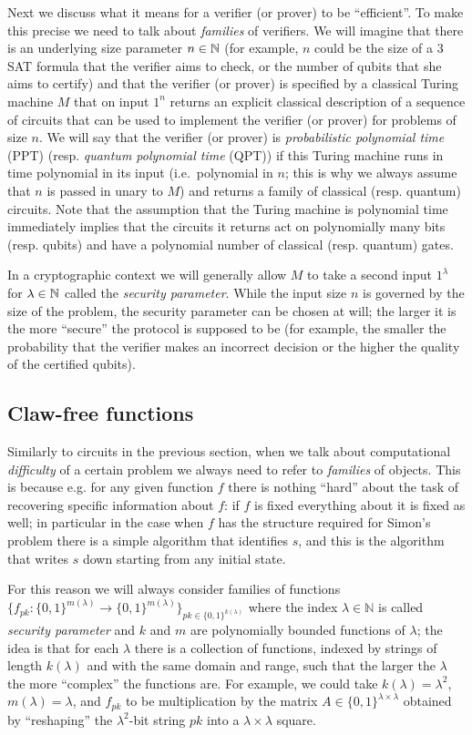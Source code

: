 Next we discuss what it means for a verifier (or prover) to be ``efficient''. To make this precise we need to talk about \emph{families} of verifiers. We will imagine that there is an underlying size parameter $n\in \mathbb{N}$ (for example, $n$ could be the size of a $3$SAT formula that the verifier aims to check, or the number of qubits that she aims to certify) and that the verifier (or prover) is specified by a classical Turing machine $M$ that on input $1^n$ returns an explicit classical description of a sequence of circuits that can be used to implement the verifier (or prover) for problems of size $n$. We will say that the verifier (or prover) is \emph{probabilistic polynomial time} (PPT) (resp. \emph{quantum polynomial time} (QPT)) if this Turing machine runs in time polynomial in its input (i.e.\ polynomial in $n$; this is why we always assume that $n$ is passed in unary to $M$) and returns a family of classical (resp. quantum) circuits. Note that the assumption that the Turing machine is polynomial time immediately implies that the circuits it returns act on polynomially many bits (resp. qubits) and have a polynomial number of classical (resp. quantum) gates. 

In a cryptographic context we will generally allow $M$ to take a second input $1^\lambda$ for $\lambda\in \mathbb{N}$ called the \emph{security parameter}. While the input size $n$ is governed by the size of the problem, the security parameter can be chosen at will; the larger it is the more ``secure'' the protocol is supposed to be (for example, the smaller the probability that the verifier makes an incorrect decision or the higher the quality of the certified qubits). 

\subsection{Claw-free functions}

Similarly to circuits in the previous section, when we talk about computational \emph{difficulty} of a certain problem we always need to refer to \emph{families} of objects. This is because e.g. for any given function $f$ there is nothing ``hard'' about the task of recovering specific information about $f$: if $f$ is fixed everything about it is fixed as well; in particular in the case when $f$ has the structure required for Simon's problem there is a simple algorithm that identifies $s$, and this is the algorithm that writes $s$ down starting from any initial state. 

For this reason we will always consider families of functions $\{f_{pk}: \{0,1\}^{m(\lambda)} \to \{0,1\}^{m(\lambda)}\}_{pk\in\{0,1\}^{k(\lambda)}}$ where the index $\lambda \in \mathbb{N}$ is called \emph{security parameter} and $k$ and $m$ are polynomially bounded functions of $\lambda$; the idea is that for each $\lambda$ there is a collection of functions, indexed by strings of length $k(\lambda)$ and with the same domain and range, such that the larger the $\lambda$ the more ``complex'' the functions are. For example, we could take $k(\lambda)=\lambda^2$, $m(\lambda)=\lambda$, and $f_{pk}$ to be multiplication by the matrix $A\in\{0,1\}^{\lambda\times \lambda}$ obtained by ``reshaping'' the $\lambda^2$-bit string $pk$ into a $\lambda\times\lambda$ square. 

